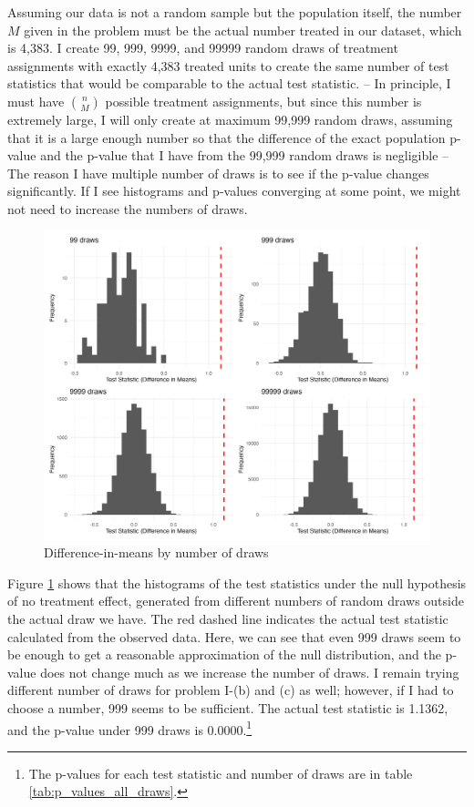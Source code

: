 \documentclass[11pt]{article}
\numberwithin{equation}{section}
\begin{document}
Assuming our data is not a random sample but the population itself, the number $M$ given in the problem must be the actual number treated in our dataset, which is 4,383. 
I create 99, 999, 9999, and 99999 random draws of treatment assignments with exactly 4,383 treated units to create the same number of test statistics that would be comparable to the actual test statistic.
 – In principle, I must have $\binom{n}{M}$ possible treatment assignments, but since this number is extremely large, I will only create at maximum 99,999 random draws, assuming that it is a large enough number so that the difference of the exact population p-value and the p-value that I have from the 99,999 random draws is negligible –
The reason I have multiple number of draws is to see if the p-value changes significantly. If I see histograms and p-values converging at some point, we might not need to increase the numbers of draws.



\begin{figure}[h]
    \centering
    \includegraphics[width=\textwidth]{output/histograms_difference_in_means.png}
    \caption{\label{fig:dim}Difference-in-means by number of draws}
\end{figure}


Figure \ref{fig:dim} shows that the histograms of the test statistics under the null hypothesis of no treatment effect, generated from different numbers of random draws outside the actual draw we have. 
The red dashed line indicates the actual test statistic calculated from the observed data. 
Here, we can see that even 999 draws seem to be enough to get a reasonable approximation of the null distribution, and the p-value does not change much as we increase the number of draws. 
I remain trying different number of draws for problem I-(b) and (c) as well; however, if I had to choose a number, 999 seems to be sufficient.
The actual test statistic is 1.1362, and the p-value under 999 draws is 0.0000.\footnote{The p-values for each test statistic and number of draws are in table \ref{tab:p_values_all_draws}.}
\end{document}
